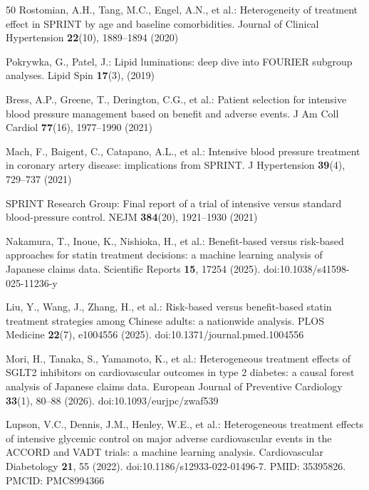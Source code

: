 \documentclass[runningheads]{llncs}
\begin{document}
\begin{thebibliography}{50}
Rostomian, A.H., Tang, M.C., Engel, A.N., et al.:
Heterogeneity of treatment effect in SPRINT by age and
baseline comorbidities.
Journal of Clinical Hypertension \textbf{22}(10), 1889--1894 (2020)

Pokrywka, G., Patel, J.:
Lipid luminations: deep dive into FOURIER subgroup analyses.
Lipid Spin \textbf{17}(3), (2019)

Bress, A.P., Greene, T., Derington, C.G., et al.:
Patient selection for intensive blood pressure management
based on benefit and adverse events.
J Am Coll Cardiol \textbf{77}(16), 1977--1990 (2021)

Mach, F., Baigent, C., Catapano, A.L., et al.:
Intensive blood pressure treatment in coronary artery disease:
implications from SPRINT.
J Hypertension \textbf{39}(4), 729--737 (2021)

SPRINT Research Group:
Final report of a trial of intensive versus standard
blood-pressure control.
NEJM \textbf{384}(20), 1921--1930 (2021)

Nakamura, T., Inoue, K., Nishioka, H., et al.:
Benefit-based versus risk-based approaches for statin treatment
decisions: a machine learning analysis of Japanese claims data.
Scientific Reports \textbf{15}, 17254 (2025).
doi:10.1038/s41598-025-11236-y

Liu, Y., Wang, J., Zhang, H., et al.:
Risk-based versus benefit-based statin treatment strategies
among Chinese adults: a nationwide analysis.
PLOS Medicine \textbf{22}(7), e1004556 (2025).
doi:10.1371/journal.pmed.1004556

Mori, H., Tanaka, S., Yamamoto, K., et al.:
Heterogeneous treatment effects of SGLT2 inhibitors on
cardiovascular outcomes in type 2 diabetes: a causal forest
analysis of Japanese claims data.
European Journal of Preventive Cardiology \textbf{33}(1), 80--88 (2026).
doi:10.1093/eurjpc/zwaf539

Lupson, V.C., Dennis, J.M., Henley, W.E., et al.:
Heterogeneous treatment effects of intensive glycemic control
on major adverse cardiovascular events in the ACCORD and VADT trials:
a machine learning analysis.
Cardiovascular Diabetology \textbf{21}, 55 (2022).
doi:10.1186/s12933-022-01496-7. PMID: 35395826. PMCID: PMC8994366

\end{thebibliography}
\end{document}
